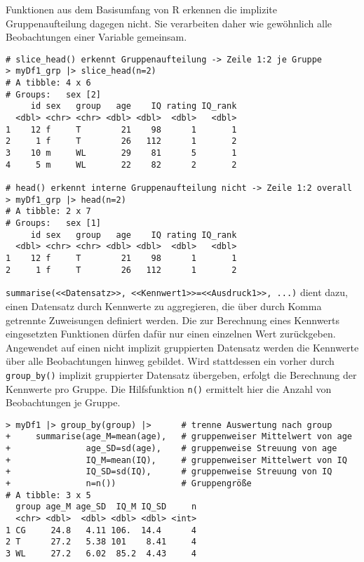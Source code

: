 Funktionen aus dem Basisumfang von R erkennen die implizite Gruppenaufteilung dagegen nicht. Sie verarbeiten daher wie gewöhnlich alle Beobachtungen einer Variable gemeinsam. 
\begin{lstlisting}
# slice_head() erkennt Gruppenaufteilung -> Zeile 1:2 je Gruppe
> myDf1_grp |> slice_head(n=2)
# A tibble: 4 x 6
# Groups:   sex [2]
     id sex   group   age    IQ rating IQ_rank
  <dbl> <chr> <chr> <dbl> <dbl>  <dbl>   <dbl>
1    12 f     T        21    98      1       1
2     1 f     T        26   112      1       2
3    10 m     WL       29    81      5       1
4     5 m     WL       22    82      2       2

# head() erkennt interne Gruppenaufteilung nicht -> Zeile 1:2 overall
> myDf1_grp |> head(n=2)
# A tibble: 2 x 7
# Groups:   sex [1]
     id sex   group   age    IQ rating IQ_rank
  <dbl> <chr> <chr> <dbl> <dbl>  <dbl>   <dbl>
1    12 f     T        21    98      1       1
2     1 f     T        26   112      1       2
\end{lstlisting}

\lstinline!summarise(<<Datensatz>>, <<Kennwert1>>=<<Ausdruck1>>, ...)! dient dazu, einen Datensatz durch Kennwerte zu aggregieren, die über durch Komma getrennte Zuweisungen definiert werden. Die zur Berechnung eines Kennwerts eingesetzten Funktionen dürfen dafür nur einen einzelnen Wert zurückgeben. Angewendet auf einen nicht implizit gruppierten Datensatz werden die Kennwerte über alle Beobachtungen hinweg gebildet. Wird stattdessen ein vorher durch \lstinline!group_by()! implizit gruppierter Datensatz übergeben, erfolgt die Berechnung der Kennwerte pro Gruppe. Die Hilfsfunktion \lstinline!n()! ermittelt hier die Anzahl von Beobachtungen je Gruppe.
\begin{lstlisting}
> myDf1 |> group_by(group) |>      # trenne Auswertung nach group
+     summarise(age_M=mean(age),   # gruppenweiser Mittelwert von age
+               age_SD=sd(age),    # gruppenweise Streuung von age
+               IQ_M=mean(IQ),     # gruppenweiser Mittelwert von IQ
+               IQ_SD=sd(IQ),      # gruppenweise Streuung von IQ
+               n=n())             # Gruppengröße
# A tibble: 3 x 5
  group age_M age_SD  IQ_M IQ_SD     n
  <chr> <dbl>  <dbl> <dbl> <dbl> <int>
1 CG     24.8   4.11 106.  14.4      4
2 T      27.2   5.38 101    8.41     4
3 WL     27.2   6.02  85.2  4.43     4
\end{lstlisting}

